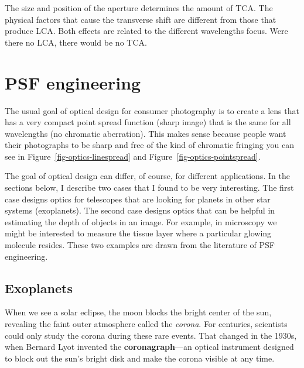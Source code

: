 \documentclass[
  letterpaper,
]{book}
\begin{document}
The size and position of the aperture determines the amount of TCA. The
physical factors that cause the transverse shift are different from
those that produce LCA. Both effects are related to the different
wavelengths focus. Were there no LCA, there would be no TCA.

\section{PSF engineering}\label{sec-optics-psf-engineering}

The usual goal of optical design for consumer photography is to create a
lens that has a very compact point spread function (sharp image) that is
the same for all wavelengths (no chromatic aberration). This makes sense
because people want their photographs to be sharp and free of the kind
of chromatic fringing you can see in Figure~\ref{fig-optics-linespread}
and Figure~\ref{fig-optics-pointspread}.

The goal of optical design can differ, of course, for different
applications. In the sections below, I describe two cases that I found
to be very interesting. The first case designs optics for telescopes
that are looking for planets in other star systems (exoplanets). The
second case designs optics that can be helpful in estimating the depth
of objects in an image. For example, in microscopy we might be
interested to measure the tissue layer where a particular glowing
molecule resides. These two examples are drawn from the literature of
PSF engineering.

\subsection{Exoplanets}\label{sec-psf-expolanets}

When we see a solar eclipse, the moon blocks the bright center of the
sun, revealing the faint outer atmosphere called the \emph{corona}. For
centuries, scientists could only study the corona during these rare
events. That changed in the 1930s, when Bernard Lyot invented the
\textbf{coronagraph}---an optical instrument designed to block out the
sun's bright disk and make the corona visible at any time.
\end{document}

